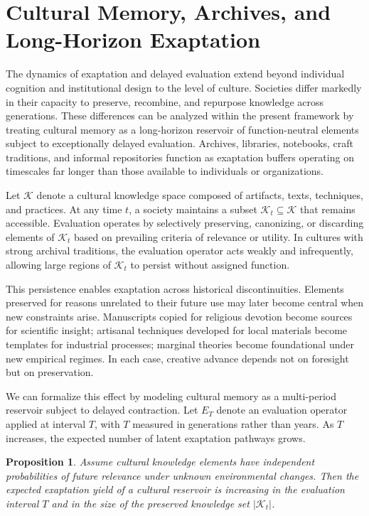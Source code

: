 \documentclass[11pt]{article}
\newtheorem{proposition}{Proposition}
\theoremstyle{definition}
\begin{document}
\section{Cultural Memory, Archives, and Long-Horizon Exaptation}

The dynamics of exaptation and delayed evaluation extend beyond individual cognition and institutional design to the level of culture. Societies differ markedly in their capacity to preserve, recombine, and repurpose knowledge across generations. These differences can be analyzed within the present framework by treating cultural memory as a long-horizon reservoir of function-neutral elements subject to exceptionally delayed evaluation. Archives, libraries, notebooks, craft traditions, and informal repositories function as exaptation buffers operating on timescales far longer than those available to individuals or organizations.

Let $\mathcal{K}$ denote a cultural knowledge space composed of artifacts, texts, techniques, and practices. At any time $t$, a society maintains a subset $\mathcal{K}_t \subseteq \mathcal{K}$ that remains accessible. Evaluation operates by selectively preserving, canonizing, or discarding elements of $\mathcal{K}_t$ based on prevailing criteria of relevance or utility. In cultures with strong archival traditions, the evaluation operator acts weakly and infrequently, allowing large regions of $\mathcal{K}_t$ to persist without assigned function.

This persistence enables exaptation across historical discontinuities. Elements preserved for reasons unrelated to their future use may later become central when new constraints arise. Manuscripts copied for religious devotion become sources for scientific insight; artisanal techniques developed for local materials become templates for industrial processes; marginal theories become foundational under new empirical regimes. In each case, creative advance depends not on foresight but on preservation.

We can formalize this effect by modeling cultural memory as a multi-period reservoir subject to delayed contraction. Let $E_T$ denote an evaluation operator applied at interval $T$, with $T$ measured in generations rather than years. As $T$ increases, the expected number of latent exaptation pathways grows.

\begin{proposition}
Assume cultural knowledge elements have independent probabilities of future relevance under unknown environmental changes. Then the expected exaptation yield of a cultural reservoir is increasing in the evaluation interval $T$ and in the size of the preserved knowledge set $\lvert \mathcal{K}_t \rvert$.
\end{proposition}
\end{document}
